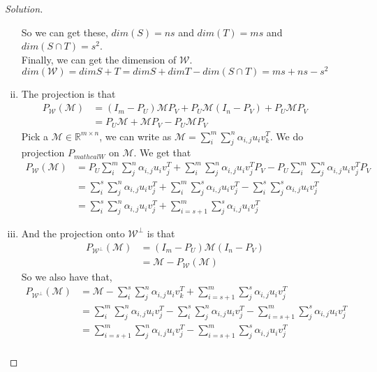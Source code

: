 \documentclass[a4paper]{article}
\newenvironment{solution}
  {\renewcommand\qedsymbol{$\blacksquare$}\begin{proof}[Solution]}
  {\end{proof}}
\begin{document}
\begin{description}
\begin{solution}
\begin{enumerate}[i)]
       So we can get these, $dim(S)=ns$ and $dim(T)=ms$ and $dim(S\cap T)=s^{2}$. \\
      Finally, we can get the dimension of $\mathcal{W}$. $$dim(\mathcal{W})=dim{S+T}=dim{S}+dim{T}-dim(S\cap T)=ms+ns-s^2$$
      \item The projection is that
      \begin{align*}
        P_{\mathcal{W}}(\mathcal{M})&=(I_{m}-P_{U})\mathcal{M}P_{V}+P_{U}\mathcal{M}(I_{n}-P_{V})+P_{U}\mathcal{M}P_{V}\\
        &=P_{U}\mathcal{M}+\mathcal{M}P_{V}-P_{U}\mathcal{M}P_{V}
      \end{align*}
      Pick a $\mathcal{M} \in \mathbb{R}^{m\times n}$, we can write as $\mathcal{M}=\sum_{i}^{m}\sum_{j}^{n}\alpha_{i,j}u_{i}v_{k}^{T}$. We do projection $P_{mathcal{W}}$ on $\mathcal{M}$. We get that
      \begin{align*}
        P_{\mathcal{W}}(\mathcal{M})&=P_{U}\sum_{i}^{m}\sum_{j}^{n}\alpha_{i,j}u_{i}v_{j}^{T}+\sum_{i}^{m}\sum_{j}^{n}\alpha_{i,j}u_{i}v_{j}^{T}P_{V}-P_{U}\sum_{i}^{m}\sum_{j}^{n}\alpha_{i,j}u_{i}v_{j}^{T}P_{V}\\
        &=\sum_{i}^{s}\sum_{j}^{n}\alpha_{i,j}u_{i}v_{j}^{T}+\sum_{i}^{m}\sum_{j}^{s}\alpha_{i,j}u_{i}v_{j}^{T}-\sum_{i}^{s}\sum_{j}^{s}\alpha_{i,j}u_{i}v_{j}^{T}\\
        &=\sum_{i}^{s}\sum_{j}^{n}\alpha_{i,j}u_{i}v_{j}^{T}+\sum_{i=s+1}^{m}\sum_{j}^{s}\alpha_{i,j}u_{i}v_{j}^{T}
      \end{align*}
      \item And the projection onto $\mathcal{W}^{\perp}$ is that
      \begin{align*}
        P_{\mathcal{W}^{\perp}}(\mathcal{M})&=(I_{m}-P_{U})\mathcal{M}(I_{n}-P_{V})\\
        &=\mathcal{M}-P_{\mathcal{W}}(\mathcal{M})
      \end{align*}
      So we also have that,
      \begin{align*}
        P_{\mathcal{W}^{\perp}}(\mathcal{M})&=\mathcal{M}-\sum_{i}^{s}\sum_{j}^{n}\alpha_{i,j}u_{i}v_{k}^{T}+\sum_{i=s+1}^{m}\sum_{j}^{s}\alpha_{i,j}u_{i}v_{j}^{T}\\
        &=\sum_{i}^{m}\sum_{j}^{n}\alpha_{i,j}u_{i}v_{j}^{T}-\sum_{i}^{s}\sum_{j}^{n}\alpha_{i,j}u_{i}v_{j}^{T}-\sum_{i=s+1}^{m}\sum_{j}^{s}\alpha_{i,j}u_{i}v_{j}^{T}\\
        &=\sum_{i=s+1}^{m}\sum_{j}^{n}\alpha_{i,j}u_{i}v_{j}^{T}-\sum_{i=s+1}^{m}\sum_{j}^{s}\alpha_{i,j}u_{i}v_{j}^{T}\\

\end{align*}
\end{enumerate}
\end{solution}
\end{description}
\end{document}
